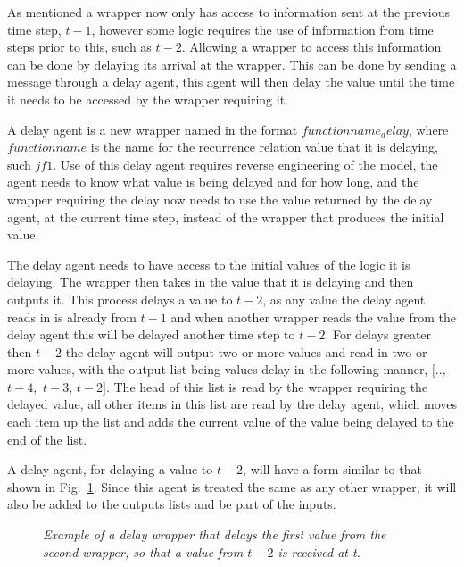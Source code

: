 \documentclass{article}
\begin{document}
As mentioned a wrapper now only has access to information sent at the previous time step, $t-1$, however some logic requires the use of information from time steps prior to this, such as $t-2$. Allowing a wrapper to access this information can be done by delaying its arrival at the wrapper. This can be done by sending a message through a delay agent, this agent will then delay the value until the time it needs to be accessed by the wrapper requiring it.  

A delay agent is a new wrapper named in the format $functionname_delay$, where $functionname$ is the name for the recurrence relation value that it is delaying, such $jf1$. Use of this delay agent requires reverse engineering of the model, the agent needs to know what value is being delayed and for how long, and the wrapper requiring the delay now needs to use the value returned by the delay agent, at the current time step, instead of the wrapper that produces the initial value.

The delay agent needs to have access to the initial values of the logic it is delaying. The wrapper then takes in the value that it is delaying and then outputs it. This process delays a value to $t-2$, as any value the delay agent reads in is already from $t-1$ and when another wrapper reads the value from the delay  agent this will be delayed another time step to $t-2$. For delays greater then $t-2$ the delay agent will output two or more values and read in two or more values, with the output list being values delay in the following manner, $[..,$ $t-4,$ $t-3$, $t-2]$. The head of this list is read by the wrapper requiring the delayed value, all other items in this list are read by the delay agent, which moves each item up the list and adds the current value of the value being delayed to the end of the list. 

A delay agent, for delaying a value to $t-2$, will have a form similar to that shown in Fig.~\ref{fig:delay4}. Since this agent is treated the same as any other wrapper, it will also be added to the outputs lists and be part of the inputs. 
\begin{figure}[H]
	\centering
	
	\caption{\it Example of a delay wrapper that delays the first value from the second wrapper, so that a value from $t-2$ is received at t.  }
	\label{fig:delay4}
\end{figure} 
  
\end{document}
